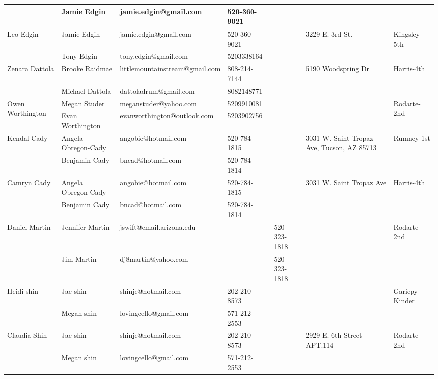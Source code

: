 \documentclass[landscape]{book}\usepackage[]{graphicx}\usepackage[]{color}
\begin{document}
\begin{longtable}{p{70pt}|p{75pt}|p{120pt}|p{60pt}|p{60pt}|p{100pt}|p{70pt}|}
 & Jamie Edgin & jamie.edgin@gmail.com & 520-360-9021 &  & & \\
\hline
\multirow{2}{70pt}{Leo Edgin} & Jamie Edgin & jamie.edgin@gmail.com & 520-360-9021 &  & \multirow{2}{100pt}{3229 E. 3rd St.} & \multirow{2}{70pt}{Kingsley-5th}\\
 & Tony Edgin & tony.edgin@gmail.com & 5203338164 &  & & \\
\hline
\multirow{2}{70pt}{Zenara Dattola} & Brooke Raidmae & littlemountainstream@gmail.com & 808-214-7144 &  & \multirow{2}{100pt}{5190 Woodspring Dr} & \multirow{2}{70pt}{Harris-4th}\\
 & Michael Dattola & dattoladrum@gmail.com & 8082148771 &  & & \\
\hline
\multirow{2}{70pt}{Owen Worthington} & Megan Studer & meganstuder@yahoo.com & 5209910081 &  & \multirow{2}{100pt}{} & \multirow{2}{70pt}{Rodarte-2nd}\\
 & Evan Worthington & evanworthington@outlook.com & 5203902756 &  & & \\
\hline
\multirow{2}{70pt}{Kendal Cady} & Angela Obregon-Cady & angobie@hotmail.com & 520-784-1815 &  & \multirow{2}{100pt}{3031 W. Saint Tropaz Ave, Tucson, AZ 85713} & \multirow{2}{70pt}{Rumney-1st}\\
 & Benjamin Cady & bncad@hotmail.com & 520-784-1814 &  & & \\
\hline
\multirow{2}{70pt}{Camryn Cady} & Angela Obregon-Cady & angobie@hotmail.com & 520-784-1815 &  & \multirow{2}{100pt}{3031 W. Saint Tropaz Ave} & \multirow{2}{70pt}{Harris-4th}\\
 & Benjamin Cady & bncad@hotmail.com & 520-784-1814 &  & & \\
\hline
\multirow{2}{70pt}{Daniel Martin} & Jennifer Martin & jswift@email.arizona.edu &  & 520-323-1818 & \multirow{2}{100pt}{} & \multirow{2}{70pt}{Rodarte-2nd}\\
 & Jim Martin & dj8martin@yahoo.com &  & 520-323-1818 & & \\
\hline
\multirow{2}{70pt}{Heidi shin} & Jae shin & shinje@hotmail.com & 202-210-8573 &  & \multirow{2}{100pt}{} & \multirow{2}{70pt}{Gariepy-Kinder}\\
 & Megan shin & lovingcello@gmail.com & 571-212-2553 &  & & \\
\hline
\multirow{2}{70pt}{Claudia Shin} & Jae shin & shinje@hotmail.com & 202-210-8573 &  & \multirow{2}{100pt}{2929 E. 6th Street APT.114} & \multirow{2}{70pt}{Rodarte-2nd}\\
 & Megan shin & lovingcello@gmail.com & 571-212-2553 &  & & \\

\end{longtable}
\end{document}

